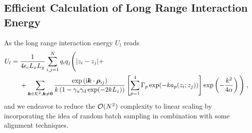 \subsection{Efficient Calculation of  Long Range Interaction Energy}
As the long range interaction  energy $U_l$ reads
\begin{align*} 
U_l&=\frac{1}{4\epsilon_{\mathrm{c}} L_xL_y}\sum_{i,j=1}^N q_iq_j\Bigg({\left\lvert z_i-z_j\right\rvert} +\\&~~~~+  \sum_{\bm{k}\in\mathcal{K}^2,\bm{k}\neq\bm{0}} \frac{ \exp{(\mathrm{i} \boldsymbol{k} \cdot \boldsymbol{\rho}_{ij})}}{k\left(1-\gamma_{\mathrm{u}}\gamma_{\mathrm{d}}\exp(-2kL_z)\right)}\left[\sum_{p=1}^4\Gamma_p\exp(-ka_p(z_i;z_j))\right] \exp\left(-\frac{k^2}{4\alpha}\right)\Bigg)\;,
\end{align*}
and we endeavor to  reduce the $\mathcal{O}(N^2)$ complexity to linear scaling by incorporating the idea of random batch sampling in combination with some alignment techniques.

